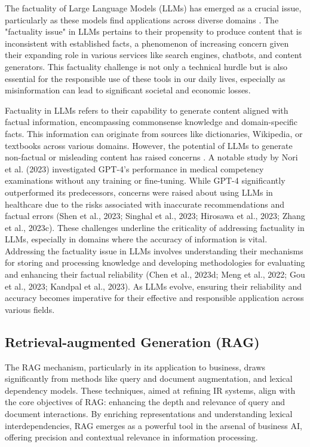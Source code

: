 \documentclass{article}
\begin{document}
The factuality of Large Language Models (LLMs) has emerged as a crucial issue, particularly as these models find applications across diverse domains \cite{wang2023survey}. The "factuality issue" in LLMs pertains to their propensity to produce content that is inconsistent with established facts, a phenomenon of increasing concern given their expanding role in various services like search engines, chatbots, and content generators. This factuality challenge is not only a technical hurdle but is also essential for the responsible use of these tools in our daily lives, especially as misinformation can lead to significant societal and economic losses.

Factuality in LLMs refers to their capability to generate content aligned with factual information, encompassing commonsense knowledge and domain-specific facts. This information can originate from sources like dictionaries, Wikipedia, or textbooks across various domains. However, the potential of LLMs to generate non-factual or misleading content has raised concerns . A notable study by Nori et al. (2023) investigated GPT-4's performance in medical competency examinations without any training or fine-tuning. While GPT-4 significantly outperformed its predecessors, concerns were raised about using LLMs in healthcare due to the risks associated with inaccurate recommendations and factual errors (Shen et al., 2023; Singhal et al., 2023; Hirosawa et al., 2023; Zhang et al., 2023c). These challenges underline the criticality of addressing factuality in LLMs, especially in domains where the accuracy of information is vital. Addressing the factuality issue in LLMs involves understanding their mechanisms for storing and processing knowledge and developing methodologies for evaluating and enhancing their factual reliability (Chen et al., 2023d; Meng et al., 2022; Gou et al., 2023; Kandpal et al., 2023). As LLMs evolve, ensuring their reliability and accuracy becomes imperative for their effective and responsible application across various fields.

\subsection{Retrieval-augmented Generation (RAG)}
The RAG mechanism, particularly in its application to business, draws significantly from methods like query and document augmentation, and lexical dependency models. These techniques, aimed at refining IR systems, align with the core objectives of RAG: enhancing the depth and relevance of query and document interactions. By enriching representations and understanding lexical interdependencies, RAG emerges as a powerful tool in the arsenal of business AI, offering precision and contextual relevance in information processing.
\end{document}
